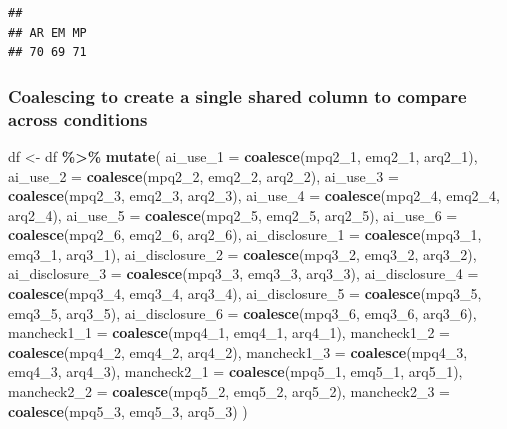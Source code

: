 \documentclass[
]{article}
\newenvironment{Shaded}{\begin{snugshade}}{\end{snugshade}}
\newcommand{\AttributeTok}[1]{\textcolor[rgb]{0.13,0.29,0.53}{#1}}
\newcommand{\FunctionTok}[1]{\textcolor[rgb]{0.13,0.29,0.53}{\textbf{#1}}}
\newcommand{\NormalTok}[1]{#1}
\newcommand{\OtherTok}[1]{\textcolor[rgb]{0.56,0.35,0.01}{#1}}
\newcommand{\SpecialCharTok}[1]{\textcolor[rgb]{0.81,0.36,0.00}{\textbf{#1}}}
\begin{document}
\begin{verbatim}
## 
## AR EM MP 
## 70 69 71
\end{verbatim}

\subsubsection{Coalescing to create a single shared column to compare
across
conditions}\label{coalescing-to-create-a-single-shared-column-to-compare-across-conditions}

\begin{Shaded}
\begin{Highlighting}[]
\NormalTok{df }\OtherTok{\textless{}{-}}\NormalTok{ df }\SpecialCharTok{\%\textgreater{}\%}
  \FunctionTok{mutate}\NormalTok{(}
    \AttributeTok{ai\_use\_1 =} \FunctionTok{coalesce}\NormalTok{(mpq2\_1, emq2\_1, arq2\_1),}
    \AttributeTok{ai\_use\_2 =} \FunctionTok{coalesce}\NormalTok{(mpq2\_2, emq2\_2, arq2\_2),}
    \AttributeTok{ai\_use\_3 =} \FunctionTok{coalesce}\NormalTok{(mpq2\_3, emq2\_3, arq2\_3),}
    \AttributeTok{ai\_use\_4 =} \FunctionTok{coalesce}\NormalTok{(mpq2\_4, emq2\_4, arq2\_4),}
    \AttributeTok{ai\_use\_5 =} \FunctionTok{coalesce}\NormalTok{(mpq2\_5, emq2\_5, arq2\_5),}
    \AttributeTok{ai\_use\_6 =} \FunctionTok{coalesce}\NormalTok{(mpq2\_6, emq2\_6, arq2\_6),}
    \AttributeTok{ai\_disclosure\_1 =} \FunctionTok{coalesce}\NormalTok{(mpq3\_1, emq3\_1, arq3\_1),}
    \AttributeTok{ai\_disclosure\_2 =} \FunctionTok{coalesce}\NormalTok{(mpq3\_2, emq3\_2, arq3\_2),}
    \AttributeTok{ai\_disclosure\_3 =} \FunctionTok{coalesce}\NormalTok{(mpq3\_3, emq3\_3, arq3\_3),}
    \AttributeTok{ai\_disclosure\_4 =} \FunctionTok{coalesce}\NormalTok{(mpq3\_4, emq3\_4, arq3\_4),}
    \AttributeTok{ai\_disclosure\_5 =} \FunctionTok{coalesce}\NormalTok{(mpq3\_5, emq3\_5, arq3\_5),}
    \AttributeTok{ai\_disclosure\_6 =} \FunctionTok{coalesce}\NormalTok{(mpq3\_6, emq3\_6, arq3\_6),}
    \AttributeTok{mancheck1\_1 =} \FunctionTok{coalesce}\NormalTok{(mpq4\_1, emq4\_1, arq4\_1),}
    \AttributeTok{mancheck1\_2 =} \FunctionTok{coalesce}\NormalTok{(mpq4\_2, emq4\_2, arq4\_2),}
    \AttributeTok{mancheck1\_3 =} \FunctionTok{coalesce}\NormalTok{(mpq4\_3, emq4\_3, arq4\_3),}
    \AttributeTok{mancheck2\_1 =} \FunctionTok{coalesce}\NormalTok{(mpq5\_1, emq5\_1, arq5\_1),}
    \AttributeTok{mancheck2\_2 =} \FunctionTok{coalesce}\NormalTok{(mpq5\_2, emq5\_2, arq5\_2),}
    \AttributeTok{mancheck2\_3 =} \FunctionTok{coalesce}\NormalTok{(mpq5\_3, emq5\_3, arq5\_3)}
\NormalTok{  )}
\end{Highlighting}
\end{Shaded}
\end{document}
